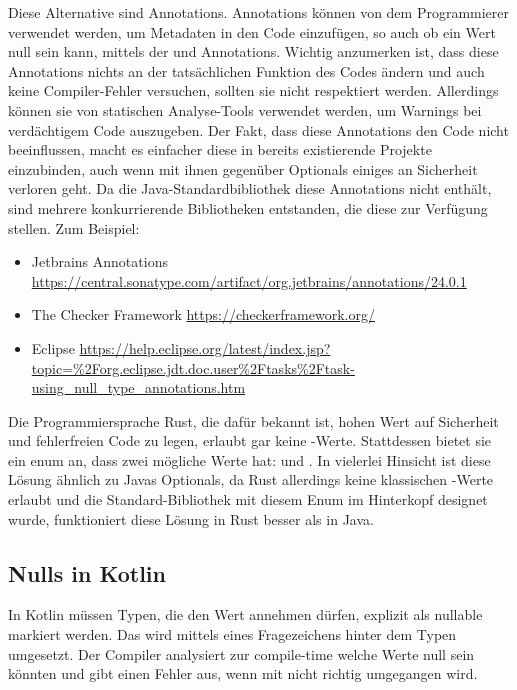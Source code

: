 Diese Alternative sind Annotations.\label{java-null-annotations}
Annotations können von dem Programmierer verwendet werden, um Metadaten in den Code einzufügen, so auch ob ein Wert null
sein kann, mittels der  und  Annotations.
Wichtig anzumerken ist, dass diese Annotations nichts an der tatsächlichen Funktion des Codes ändern und auch keine
Compiler-Fehler versuchen, sollten sie nicht respektiert werden.
Allerdings können sie von statischen Analyse-Tools verwendet werden, um Warnings bei verdächtigem Code auszugeben.
Der Fakt, dass diese Annotations den Code nicht beeinflussen, macht es einfacher diese in bereits existierende Projekte
einzubinden, auch wenn mit ihnen gegenüber Optionals einiges an Sicherheit verloren geht.
Da die Java-Standardbibliothek diese Annotations nicht enthält, sind mehrere konkurrierende Bibliotheken entstanden,
die diese zur Verfügung stellen.
Zum Beispiel:
\begin{itemize}
    \item Jetbrains Annotations \url{https://central.sonatype.com/artifact/org.jetbrains/annotations/24.0.1}
    \item The Checker Framework \url{https://checkerframework.org/}
    \item Eclipse \url{https://help.eclipse.org/latest/index.jsp?topic=%2Forg.eclipse.jdt.doc.user%2Ftasks%2Ftask-using_null_type_annotations.htm}
\end{itemize}

Die Programmiersprache Rust, die dafür bekannt ist, hohen Wert auf Sicherheit und fehlerfreien Code zu legen, erlaubt
gar keine -Werte.
Stattdessen bietet sie ein  enum an, dass zwei mögliche Werte hat:
 und .
In vielerlei Hinsicht ist diese Lösung ähnlich zu Javas Optionals, da Rust allerdings keine klassischen
-Werte erlaubt und die Standard-Bibliothek mit diesem Enum im Hinterkopf designet wurde, funktioniert
diese Lösung in Rust besser als in Java.\cite{rustDocOptional}

\subsection{Nulls in Kotlin}
In Kotlin müssen Typen, die den Wert  annehmen dürfen, explizit als nullable markiert werden.
Das wird mittels eines Fragezeichens hinter dem Typen umgesetzt.
Der Compiler analysiert zur compile-time welche Werte null sein könnten und gibt einen Fehler aus, wenn mit
 nicht richtig umgegangen wird.\cite{kdocNullSafety}

